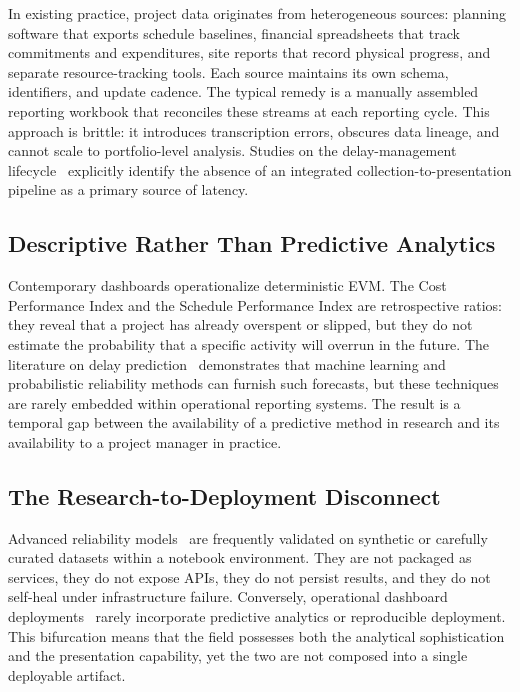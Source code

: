 \documentclass[conference]{IEEEtran}
\begin{document}
In existing practice, project data originates from heterogeneous sources: planning software that exports schedule baselines, financial spreadsheets that track commitments and expenditures, site reports that record physical progress, and separate resource-tracking tools. Each source maintains its own schema, identifiers, and update cadence. The typical remedy is a manually assembled reporting workbook that reconciles these streams at each reporting cycle. This approach is brittle: it introduces transcription errors, obscures data lineage, and cannot scale to portfolio-level analysis. Studies on the delay-management lifecycle~\cite{radman2022digital} explicitly identify the absence of an integrated collection-to-presentation pipeline as a primary source of latency.

\subsection{Descriptive Rather Than Predictive Analytics}

Contemporary dashboards operationalize deterministic EVM. The Cost Performance Index and the Schedule Performance Index are retrospective ratios: they reveal that a project has already overspent or slipped, but they do not estimate the probability that a specific activity will overrun in the future. The literature on delay prediction~\cite{sanusi2024role,zhang2023quantifying} demonstrates that machine learning and probabilistic reliability methods can furnish such forecasts, but these techniques are rarely embedded within operational reporting systems. The result is a temporal gap between the availability of a predictive method in research and its availability to a project manager in practice.

\subsection{The Research-to-Deployment Disconnect}

Advanced reliability models~\cite{zhang2023quantifying} are frequently validated on synthetic or carefully curated datasets within a notebook environment. They are not packaged as services, they do not expose APIs, they do not persist results, and they do not self-heal under infrastructure failure. Conversely, operational dashboard deployments~\cite{alsulaiti2021using,gajera2023integrating} rarely incorporate predictive analytics or reproducible deployment. This bifurcation means that the field possesses both the analytical sophistication and the presentation capability, yet the two are not composed into a single deployable artifact.
\end{document}
